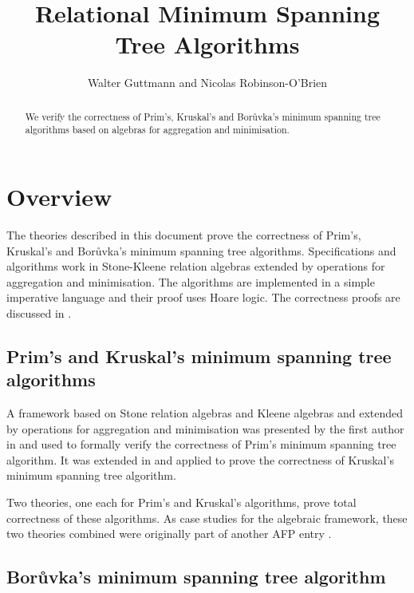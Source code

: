 \documentclass[11pt,a4paper]{article}
\begin{document}
\title{Relational Minimum Spanning Tree Algorithms}
\author{Walter Guttmann and Nicolas Robinson-O'Brien}
\maketitle

\begin{abstract}
  We verify the correctness of Prim's, Kruskal's and Bor\r{u}vka's minimum spanning tree algorithms based on algebras for aggregation and minimisation.
\end{abstract}

\tableofcontents

\section{Overview}

The theories described in this document prove the correctness of Prim's, Kruskal's and Bor\r{u}vka's minimum spanning tree algorithms.
Specifications and algorithms work in Stone-Kleene relation algebras extended by operations for aggregation and minimisation.
The algorithms are implemented in a simple imperative language and their proof uses Hoare logic.
The correctness proofs are discussed in \cite{Guttmann2016c,Guttmann2018b,Guttmann2018c,RobinsonOBrien2020}.

\subsection{Prim's and Kruskal's minimum spanning tree algorithms}

A framework based on Stone relation algebras and Kleene algebras and extended by operations for aggregation and minimisation was presented by the first author in \cite{Guttmann2016c,Guttmann2018b} and used to formally verify the correctness of Prim's minimum spanning tree algorithm.
It was extended in \cite{Guttmann2018c} and applied to prove the correctness of Kruskal's minimum spanning tree algorithm.

Two theories, one each for Prim's and Kruskal's algorithms, prove total correctness of these algorithms.
As case studies for the algebraic framework, these two theories combined were originally part of another AFP entry \cite{Guttmann2018a}.

\subsection{Bor\r{u}vka's minimum spanning tree algorithm}
\end{document}
